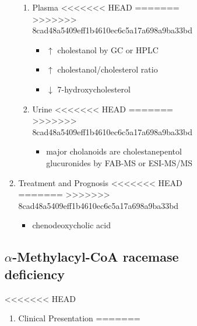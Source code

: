 \documentclass{scrartcl}
\begin{document}
\begin{itemize}
\begin{enumerate}
\begin{enumerate}
\begin{enumerate}
\begin{itemize}
\begin{enumerate}
\begin{enumerate}
\begin{enumerate}
\item Plasma
<<<<<<< HEAD
\label{sec:org96c2662}
=======
\label{sec:org151aa6e}
>>>>>>> 8cad48a5409eff1b4610ec6c5a17a698a9ba33bd
\begin{itemize}
\item \(\uparrow\) cholestanol by GC or HPLC
\item \(\uparrow\) cholestanol/cholesterol ratio
\item \(\downarrow\) 7-hydroxycholesterol
\end{itemize}
\item Urine
<<<<<<< HEAD
\label{sec:org216a2cd}
=======
\label{sec:orgfd10bb1}
>>>>>>> 8cad48a5409eff1b4610ec6c5a17a698a9ba33bd
\begin{itemize}
\item major cholanoids are cholestanepentol glucuronides by FAB-MS or ESI-MS/MS
\end{itemize}
\end{enumerate}

\item Treatment and Prognosis
<<<<<<< HEAD
\label{sec:orgb24c395}
=======
\label{sec:orgeaea441}
>>>>>>> 8cad48a5409eff1b4610ec6c5a17a698a9ba33bd
\begin{itemize}
\item chenodeoxycholic acid
\end{itemize}
\end{enumerate}
\subsection{\(\alpha\)-Methylacyl-CoA racemase deficiency}
<<<<<<< HEAD
\label{sec:orga2c9735}

\begin{enumerate}
\item Clinical Presentation
\label{sec:orgd9b4f0b}
=======
\label{sec:org2e17bcc}


\end{enumerate}
\end{enumerate}
\end{itemize}
\end{enumerate}
\end{enumerate}
\end{enumerate}
\end{itemize}
\end{document}
